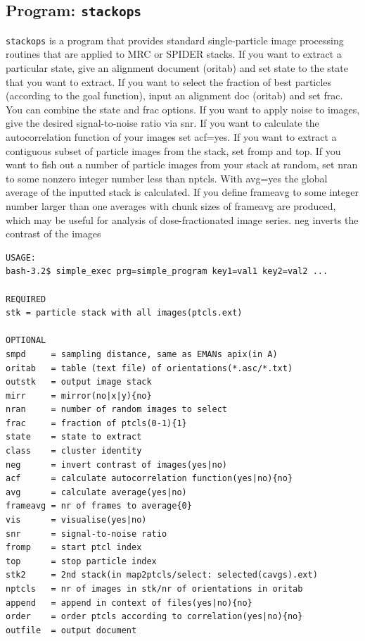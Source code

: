 \documentclass[a4paper,11pt]{article}
\newcommand{\prgname}[1]{\textcolor{NavyBlue}{\texttt{#1}}}
\begin{document}
\subsection{Program: \prgname{stackops}}
\label{stackops}
\prgname{stackops} is a program that provides standard single-particle image processing routines that are applied to MRC or SPIDER stacks. If you want to extract a particular state, give an alignment document (oritab) and set state to the state that you want to extract. If you want to select the fraction of best particles (according to the goal function), input an alignment doc (oritab) and set frac. You can combine the state and frac options. If you want to apply noise to images, give the desired signal-to-noise ratio via snr. If you want to calculate the autocorrelation function of your images set acf=yes. If you want to extract a contiguous subset of particle images from the stack, set fromp and top. If you want to fish out a number of particle images from your stack at random, set nran to some nonzero integer number less than nptcls. With avg=yes the global average of the inputted stack is calculated. If you define frameavg to some integer number larger than one averages with chunk sizes of frameavg are produced, which may be useful for analysis of dose-fractionated image series. neg inverts the contrast of the images

\begin{verbatim}
USAGE:
bash-3.2$ simple_exec prg=simple_program key1=val1 key2=val2 ...

REQUIRED
stk = particle stack with all images(ptcls.ext)

OPTIONAL
smpd     = sampling distance, same as EMANs apix(in A)
oritab   = table (text file) of orientations(*.asc/*.txt)
outstk   = output image stack
mirr     = mirror(no|x|y){no}
nran     = number of random images to select
frac     = fraction of ptcls(0-1){1}
state    = state to extract
class    = cluster identity
neg      = invert contrast of images(yes|no)
acf      = calculate autocorrelation function(yes|no){no}
avg      = calculate average(yes|no)
frameavg = nr of frames to average{0}
vis      = visualise(yes|no)
snr      = signal-to-noise ratio
fromp    = start ptcl index
top      = stop particle index
stk2     = 2nd stack(in map2ptcls/select: selected(cavgs).ext)
nptcls   = nr of images in stk/nr of orientations in oritab
append   = append in context of files(yes|no){no}
order    = order ptcls according to correlation(yes|no){no}
outfile  = output document
\end{verbatim}
\end{document}
